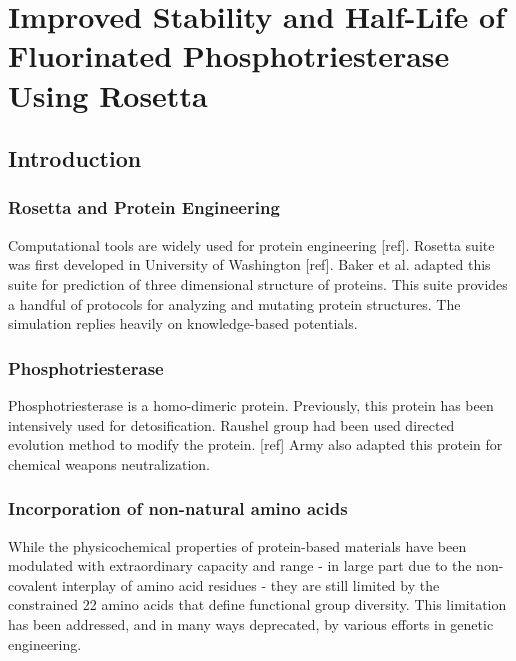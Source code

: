 \chapter{Improved Stability and Half-Life of Fluorinated Phosphotriesterase Using Rosetta}
\label{chap:rosetta}
\begin{refsection}

\section{Introduction}

\subsection{Rosetta and Protein Engineering}

\label{sec:rosetta}

Computational tools are widely used for protein engineering [ref]. Rosetta
suite was first developed in University of Washington [ref]. Baker et al.
adapted this suite for prediction of three dimensional structure of proteins.
This suite provides a handful of protocols for analyzing and mutating protein
structures. The simulation replies heavily on knowledge-based potentials.\cite{Singh2015, Yang2014a}

\subsection{Phosphotriesterase}
\label{sec:pte}

Phosphotriesterase is a homo-dimeric protein. Previously, this protein has been
intensively used for detosification. Raushel group had been used directed
evolution method to modify the protein. [ref] Army also adapted this protein
for chemical weapons neutralization. \cite{Yang2014a}

\subsection{Incorporation of non-natural amino acids}
\label{sec:rsi}

While the physicochemical properties of protein-based materials have been
modulated with extraordinary capacity and range - in large part due to
the non-covalent interplay of amino acid residues - they are still limited by
the constrained 22 amino acids that define functional group diversity.
This limitation has been addressed, and in many ways deprecated, by various
efforts in genetic engineering.


\end{refsection}
